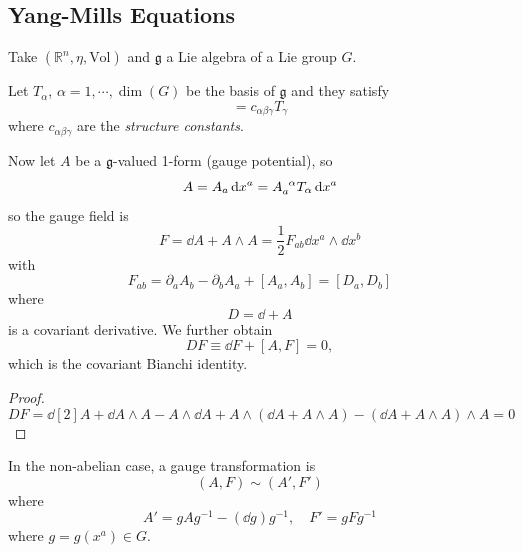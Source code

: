 \documentclass[a4paper,11pt]{article}
\begin{document}
    \subsection{Yang-Mills Equations}
    Take $(\mathbb{R}^n, \eta, \text{Vol})$ and $\mathfrak{g}$ a Lie algebra of a Lie group $G$. 

    Let $T_\alpha$, $\alpha = 1, \cdots, \dim(G)$ be the basis of $\mathfrak{g}$ and they satisfy 
    \begin{equation}
        [T_\alpha, T_\beta] = c_{\alpha \beta \gamma} T_\gamma
    \end{equation} 
    where $c_{\alpha \beta \gamma}$ are the \emph{structure constants}.

    Now let $A$ be a $\mathfrak{g}$-valued 1-form (gauge potential), so 
    \begin{equation}
        A = A_a \dd{x^a} = A\indices{_a^\alpha} T_\alpha \dd{x^a}
    \end{equation}
    so the gauge field is 
    \begin{equation}
        F = \dd{A} + A \wedge A = \frac{1}{2} F_{ab} \dd{x^a} \wedge \dd{x^b}
    \end{equation}
    with
    \begin{equation}
        F_{ab} = \partial_a A_b - \partial_b A_a + [A_a, A_b] = [D_a, D_b]
    \end{equation}
    where 
    \begin{equation}
        D = \dd{} + A
    \end{equation}
    is a covariant derivative. We further obtain 
    \begin{equation}
        D F \equiv \dd{F} + [A,F] = 0,
    \end{equation}
    which is the covariant Bianchi identity.
    \begin{proof}
        \begin{equation}
            D F = \dd[2]{A} + \dd{A} \wedge A - A \wedge \dd{A} + A \wedge (\dd{A} + A \wedge A) - (\dd{A} + A \wedge A) \wedge A = 0
        \end{equation}
    \end{proof}
    
    In the non-abelian case, a gauge transformation is 
    \begin{equation}
        (A,F) \sim (A',F')
    \end{equation}
    where 
    \begin{equation}
        A' = g A g^{-1} - (\dd{g}) g^{-1}, \quad F' = g F g^{-1}
    \end{equation}
    where $g = g(x^a) \in G$.
\end{document}

